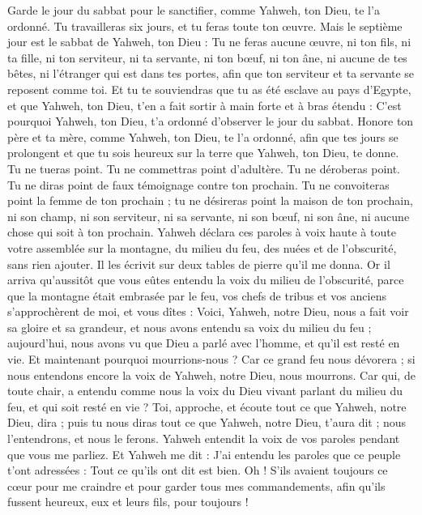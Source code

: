 \begin{multicols}{2}
Garde le jour du sabbat pour le sanctifier, comme Yahweh, ton Dieu, te l'a ordonné.
Tu travailleras six jours, et tu feras toute ton œuvre.
Mais le septième jour est le sabbat de Yahweh, ton Dieu : Tu ne feras aucune œuvre, ni ton fils, ni ta fille, ni ton serviteur, ni ta servante, ni ton bœuf, ni ton âne, ni aucune de tes bêtes, ni l’étranger qui est dans tes portes, afin que ton serviteur et ta servante se reposent comme toi.
Et tu te souviendras que tu as été esclave au pays d'Egypte, et que Yahweh, ton Dieu, t'en a fait sortir à main forte et à bras étendu : C'est pourquoi Yahweh, ton Dieu, t'a ordonné d’observer le jour du sabbat.
Honore ton père et ta mère, comme Yahweh, ton Dieu, te l'a ordonné, afin que tes jours se prolongent et que tu sois heureux sur la terre que Yahweh, ton Dieu, te donne.
Tu ne tueras point.
Tu ne commettras point d’adultère.
Tu ne déroberas point.
Tu ne diras point de faux témoignage contre ton prochain.
Tu ne convoiteras point la femme de ton prochain ; tu ne désireras point la maison de ton prochain, ni son champ, ni son serviteur, ni sa servante, ni son bœuf, ni son âne, ni aucune chose qui soit à ton prochain.
Yahweh déclara ces paroles à voix haute à toute votre assemblée sur la montagne, du milieu du feu, des nuées et de l'obscurité, sans rien ajouter. Il les écrivit sur deux tables de pierre qu'il me donna.
Or il arriva qu’aussitôt que vous eûtes entendu la voix du milieu de l'obscurité, parce que la montagne était embrasée par le feu, vos chefs de tribus et vos anciens s’approchèrent de moi,
et vous dîtes : Voici, Yahweh, notre Dieu, nous a fait voir sa gloire et sa grandeur, et nous avons entendu sa voix du milieu du feu ; aujourd'hui, nous avons vu que Dieu a parlé avec l'homme, et qu’il est resté en vie.
Et maintenant pourquoi mourrions-nous ? Car ce grand feu nous dévorera ; si nous entendons encore la voix de Yahweh, notre Dieu, nous mourrons.
Car qui, de toute chair, a entendu comme nous la voix du Dieu vivant parlant du milieu du feu, et qui soit resté en vie ?
Toi, approche, et écoute tout ce que Yahweh, notre Dieu, dira ; puis tu nous diras tout ce que Yahweh, notre Dieu, t'aura dit ; nous l'entendrons, et nous le ferons.
Yahweh entendit la voix de vos paroles pendant que vous me parliez. Et Yahweh me dit : J'ai entendu les paroles que ce peuple t'ont adressées : Tout ce qu’ils ont dit est bien.
Oh ! S’ils avaient toujours ce cœur pour me craindre et pour garder tous mes commandements, afin qu'ils fussent heureux, eux et leurs fils, pour toujours !

\end{multicols}
